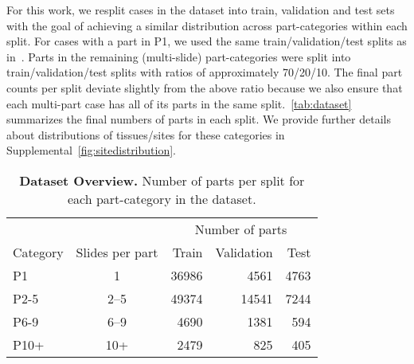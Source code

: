 \documentclass[11pt]{article}
\begin{document}
For this work, we resplit cases in the dataset into train, validation and test sets with the goal of achieving a similar distribution across part-categories within each split. For cases with a part in P1, we used the same train/validation/test splits as in~\citet{ahmed2024pathalign}. Parts in the remaining (multi-slide) part-categories were split into train/validation/test splits with ratios of approximately 70/20/10. The final part counts per split deviate slightly from the above ratio because we also ensure that each multi-part case has all of its parts in the same split.~\autoref{tab:dataset} summarizes the final numbers of parts in each split. We provide further details about distributions of tissues/sites for these categories in Supplemental~\autoref{fig:sitedistribution}.


\begin{table}[t]
\small
\centering
\caption{\textbf{Dataset Overview.} Number of parts per split for each part-category in the dataset.}
\begin{tabular}{@{}lcrrr@{}}
\toprule
 & & \multicolumn{3}{c}{Number of parts} \\
\cmidrule(lr){3-5}
Category & Slides per part & Train & Validation & Test \\
\midrule
\textsc{P1} & 1 & 36986 & 4561 & 4763 \\
\textsc{P2-5} & 2--5 & 49374 & 14541 & 7244 \\
\textsc{P6-9} & 6--9 & 4690 & 1381 & 594 \\
\textsc{P10+} & 10+ & 2479 & 825 & 405 \\
\bottomrule
\end{tabular}
\label{tab:dataset}
\end{table}
\end{document}
